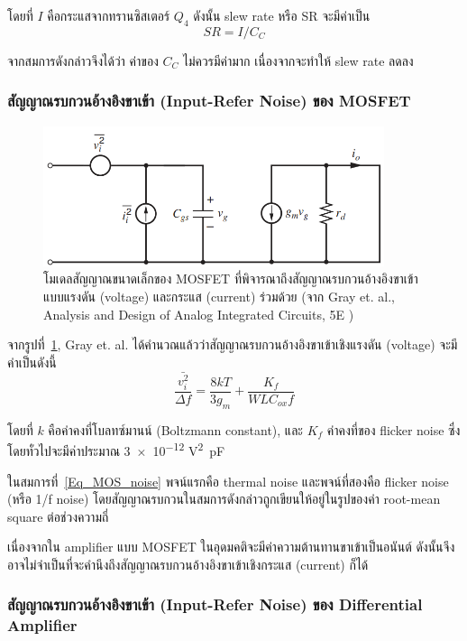 \documentclass[a4paper, 11pt, oneside]{book} %
\begin{document}
โดยที่ $I$ คือกระแสจากทรานซิสเตอร์ $Q_4$ ดังนั้น slew rate หรือ SR จะมีค่าเป็น
\begin{equation}
    SR = I/C_C 
    \label{slew-eq}
\end{equation}

จากสมการดังกล่าวจึงได้ว่า ค่าของ $C_C$ ไม่ควรมีค่ามาก เนื่องจากจะทำให้ slew rate ลดลง

\subsubsection{สัญญาณรบกวนอ้างอิงขาเข้า (Input-Refer Noise) ของ MOSFET}

\begin{figure}[h]
    \centering
    \includegraphics[width = 10cm]{MOS_noise_inputrefer}
    \caption{โมเดลสัญญาณขนาดเล็กของ MOSFET ที่พิจารณาถึงสัญญาณรบกวนอ้างอิงขาเข้าแบบแรงดัน (voltage) และกระแส (current) ร่วมด้วย (จาก Gray et. al., Analysis and Design of Analog Integrated Circuits, 5E \cite{Grey09})}
    \label{MOS_noise_inputrefer}
\end{figure}

จากรูปที่~\ref{MOS_noise_inputrefer}, Gray et. al. \cite{Grey09} ได้คำนวณแล้วว่าสัญญาณรบกวนอ้างอิงขาเข้าเชิงแรงดัน (voltage) จะมีค่าเป็นดังนี้
\begin{equation}
    \frac{\bar{v_i^2}}{\Delta f} = \frac{8kT}{3g_m} + \frac{K_f}{WLC_{ox}f} \label{Eq_MOS_noise}
\end{equation}

โดยที่ $k$ คือค่าคงที่โบลทซ์มานน์ (Boltzmann constant), และ $K_f$ ค่าคงที่ของ flicker noise ซึ่งโดยทั่วไปจะมีค่าประมาณ \num{3e-12} \si{V^2.\pico F}

ในสมการที่~\ref{Eq_MOS_noise} พจน์แรกคือ thermal noise และพจน์ที่สองคือ flicker noise (หรือ 1/f noise) โดยสัญญาณรบกวนในสมการดังกล่าวถูกเขียนให้อยู่ในรูปของค่า root-mean square ต่อช่วงความถี่

เนื่องจากใน amplifier แบบ MOSFET ในอุดมคติจะมีค่าความต้านทานขาเข้าเป็นอนันต์ ดังนั้นจึงอาจไม่จำเป็นที่จะคำนึงถึงสัญญาณรบกวนอ้างอิงขาเข้าเชิงกระแส (current) ก็ได้

\subsubsection{สัญญาณรบกวนอ้างอิงขาเข้า (Input-Refer Noise) ของ Differential Amplifier}
\end{document}
